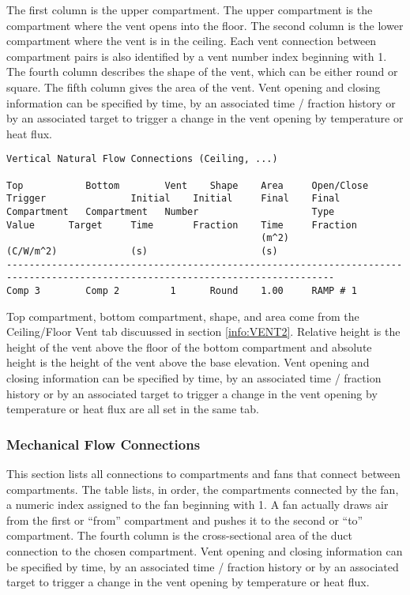The first column is the upper compartment.  The upper compartment is the compartment where the vent opens into the floor.  The second column is the lower compartment where the vent is in the ceiling. Each vent connection between compartment pairs is also identified by a vent number index beginning with 1. The fourth column describes the shape of the vent, which can be either round or square.  The fifth column gives the area of the vent. Vent opening and closing information can be specified by time, by an associated time / fraction history or by an associated target to trigger a change in the vent opening by temperature or heat flux.
\begin{lstlisting}[basicstyle=\tiny]
Vertical Natural Flow Connections (Ceiling, ...)

Top           Bottom        Vent    Shape    Area     Open/Close  Trigger               Initial    Initial     Final    Final
Compartment   Compartment   Number                    Type        Value      Target     Time       Fraction    Time     Fraction
                                             (m^2)                (C/W/m^2)             (s)                    (s)
--------------------------------------------------------------------------------------------------------------------------------
Comp 3        Comp 2         1      Round    1.00     RAMP # 1
\end{lstlisting}
Top compartment, bottom compartment, shape, and area come from the Ceiling/Floor Vent tab discuussed in section \ref{info:VENT2}. Relative height is the height of the vent above the floor of the bottom compartment and absolute height is the height of the vent above the base elevation.  Vent opening and closing information can be specified by time, by an associated time / fraction history or by an associated target to trigger a change in the vent opening by temperature or heat flux are all set in the same tab.

\subsubsection{Mechanical Flow Connections}

This section lists all connections to compartments and fans that connect between compartments. The table lists, in order, the compartments connected by the fan, a numeric index assigned to the fan beginning with 1.  A fan actually draws air from the first or ``from'' compartment and pushes it to the second or ``to'' compartment. The fourth column is the cross-sectional area of the duct connection to the chosen compartment. Vent opening and closing information can be specified by time, by an associated time / fraction history or by an associated target to trigger a change in the vent opening by temperature or heat flux.

